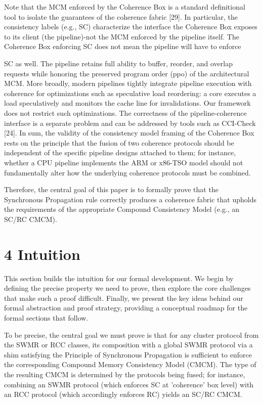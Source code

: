 \documentclass[10pt]{article}
\begin{document}
Note that the MCM enforced by the Coherence Box is a standard definitional tool to isolate the guarantees of the coherence fabric [29]. In particular, the consistency labels (e.g., SC) characterize the interface the Coherence Box exposes to its client (the pipeline)-not the MCM enforced by the pipeline itself. The Coherence Box enforcing SC does not mean the pipeline will have to enforce

SC as well. The pipeline retains full ability to buffer, reorder, and overlap requests while honoring the preserved program order (ppo) of the architectural MCM. More broadly, modern pipelines tightly integrate pipeline execution with coherence for optimizations such as speculative load reordering: a core executes a load speculatively and monitors the cache line for invalidations. Our framework does not restrict such optimizations. The correctness of the pipeline-coherence interface is a separate problem and can be addressed by tools such as CCI-Check [24]. In sum, the validity of the consistency model framing of the Coherence Box rests on the principle that the fusion of two coherence protocols should be independent of the specific pipeline designs attached to them; for instance, whether a CPU pipeline implements the ARM or x86-TSO model should not fundamentally alter how the underlying coherence protocols must be combined.

Therefore, the central goal of this paper is to formally prove that the Synchronous Propagation rule correctly produces a coherence fabric that upholds the requirements of the appropriate Compound Consistency Model (e.g., an SC/RC CMCM).

\section*{4 Intuition}
This section builds the intuition for our formal development. We begin by defining the precise property we need to prove, then explore the core challenges that make such a proof difficult. Finally, we present the key ideas behind our formal abstraction and proof strategy, providing a conceptual roadmap for the formal sections that follow.

To be precise, the central goal we must prove is that for any cluster protocol from the SWMR or RCC classes, its composition with a global SWMR protocol via a shim satisfying the Principle of Synchronous Propagation is sufficient to enforce the corresponding Compound Memory Consistency Model (CMCM). The type of the resulting CMCM is determined by the protocols being fused; for instance, combining an SWMR protocol (which enforces SC at 'coherence' box level) with an RCC protocol (which accordingly enforces RC) yields an SC/RC CMCM.
\end{document}
